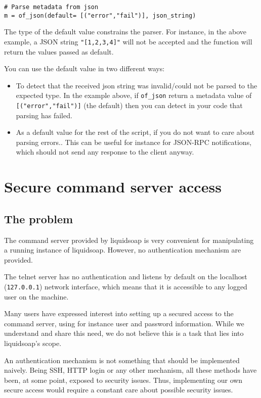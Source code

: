 \begin{verbatim}
# Parse metadata from json
m = of_json(default= [("error","fail")], json_string)
\end{verbatim}
The type of the default value constrains the parser. For instance, in the above
example, a JSON string \verb+"[1,2,3,4]"+ will not be accepted and the function
will return the values passed as default.

You can use the default value in two different ways:
\begin{itemize}
\item To detect that the received json string was invalid/could not be parsed to
  the expected type. In the example above, if \verb+of_json+ return a metadata
  value of \verb+[("error","fail")]+ (the default) then you can detect in your
  code that parsing has failed.
\item As a default value for the rest of the script, if you do not want to care
  about parsing errors.. This can be useful for instance for JSON-RPC
  notifications, which should not send any response to the client anyway.
\end{itemize}

\section{Secure command server access}
\subsection{The problem}
The command server provided by liquidsoap is very convenient for 
manipulating a running instance of liquidsoap. However, no authentication
mechanism are provided. 

The telnet server has no authentication and listens
by default on the localhost (\verb+127.0.0.1+) network interface,
which means that it is accessible to any logged user on the machine.

Many users have expressed interest into setting up a secured access
to the command server, using for instance user and password information.
While we understand and share this need, we do not believe this 
is a task that lies into liquidsoap's scope.

An authentication mechanism is not something that should be implemented 
naively. Being SSH, HTTP login or any other mechanism, all these methods
have been, at some point, exposed to security issues. Thus, implementing
our own secure access would require a constant care about possible security
issues.

